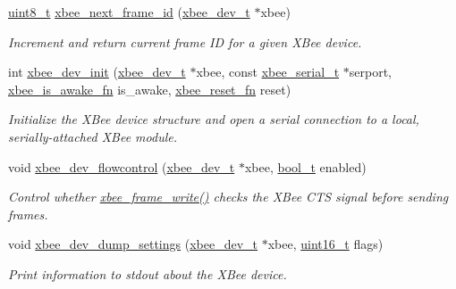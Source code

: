 \begin{DoxyCompactItemize}
\item 
\hyperlink{group__hal__dos_gae1affc9ca37cfb624959c866a73f83c2}{uint8\+\_\+t} \hyperlink{group__xbee__device_ga9faca10d7a960dcd3c0c3ad9c0d59cab}{xbee\+\_\+next\+\_\+frame\+\_\+id} (\hyperlink{structxbee__dev__t}{xbee\+\_\+dev\+\_\+t} $\ast$xbee)
\begin{DoxyCompactList}\small\item\em Increment and return current frame ID for a given X\+Bee device. \end{DoxyCompactList}\item 
int \hyperlink{group__xbee__device_ga550d7c865e75d3fc1df0e64cb880cf3d}{xbee\+\_\+dev\+\_\+init} (\hyperlink{structxbee__dev__t}{xbee\+\_\+dev\+\_\+t} $\ast$xbee, const \hyperlink{structxbee__serial__t}{xbee\+\_\+serial\+\_\+t} $\ast$serport, \hyperlink{group__xbee__device_ga47d67ee70583d9a2a0cf7ae1eb672af8}{xbee\+\_\+is\+\_\+awake\+\_\+fn} is\+\_\+awake, \hyperlink{group__xbee__device_gaa6b2701f8516c2947424178c4bacab83}{xbee\+\_\+reset\+\_\+fn} reset)
\begin{DoxyCompactList}\small\item\em Initialize the X\+Bee device structure and open a serial connection to a local, serially-\/attached X\+Bee module. \end{DoxyCompactList}\item 
void \hyperlink{group__xbee__device_ga75bfe1292b8af0588e0e322a42d3d2dc}{xbee\+\_\+dev\+\_\+flowcontrol} (\hyperlink{structxbee__dev__t}{xbee\+\_\+dev\+\_\+t} $\ast$xbee, \hyperlink{group__hal__dos_ga04dd5074964518403bf944f2b240a5f8}{bool\+\_\+t} enabled)
\begin{DoxyCompactList}\small\item\em Control whether \hyperlink{group__xbee__device_ga51f281b72bffcc99eec0e8c7f65a5f3f}{xbee\+\_\+frame\+\_\+write()} checks the X\+Bee C\+TS signal before sending frames. \end{DoxyCompactList}\item 
void \hyperlink{group__xbee__device_ga96267a6b36d9a1b1d59b16cc60a2b09a}{xbee\+\_\+dev\+\_\+dump\+\_\+settings} (\hyperlink{structxbee__dev__t}{xbee\+\_\+dev\+\_\+t} $\ast$xbee, \hyperlink{group__hal__dos_ga5a8b2dc9e45a9ee81a94ef304fb62505}{uint16\+\_\+t} flags)
\begin{DoxyCompactList}\small\item\em Print information to stdout about the X\+Bee device. \end{DoxyCompactList}\item 

\end{DoxyCompactItemize}
